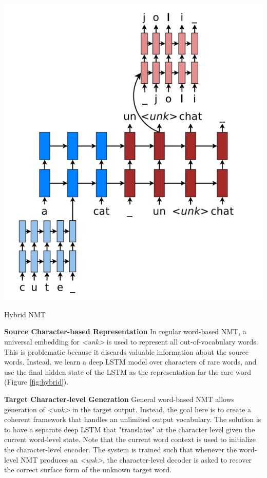 \documentclass{tufte-handout}
\begin{document}
\begin{marginfigure}
	\centering
	\includegraphics[width=0.9\linewidth]{hybrid.png}
	\caption {Hybrid NMT}
	\label{fig:hybrid}
\end{marginfigure}

\textbf{Source Character-based Representation} In regular word-based NMT, a universal embedding for \textit{<unk>} is used to represent all out-of-vocabulary words. This is problematic because it discards valuable information about the source words. Instead, we learn a deep LSTM model over characters of rare words, and use the final hidden state of the LSTM as the representation for the rare word (Figure \ref{fig:hybrid}).

\textbf{Target Character-level Generation} General word-based NMT allows generation of \textit{<unk>} in the target output. Instead, the goal here is to create a coherent framework that handles an unlimited output vocabulary. The solution is to have a separate deep LSTM that "translates" at the character level given the current word-level state. Note that the current word context is used to initialize the character-level encoder. The system is trained such that whenever the word-level NMT produces an \textit{<unk>}, the character-level decoder is asked to recover the correct surface form of the unknown target word.



\end{document}
